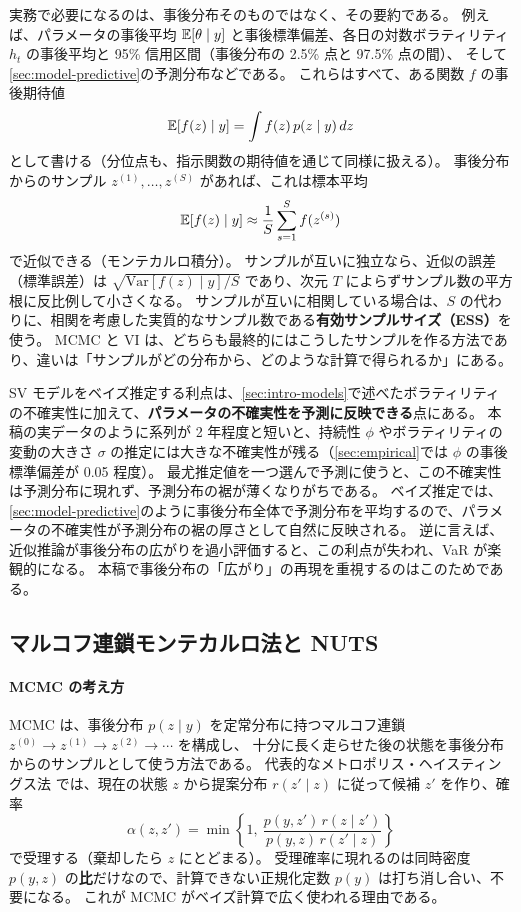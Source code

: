 実務で必要になるのは、事後分布そのものではなく、その要約である。
例えば、パラメータの事後平均 $\mathbb{E}[\theta \mid y]$ と事後標準偏差、各日の対数ボラティリティ $h_t$ の事後平均と 95\% 信用区間（事後分布の 2.5\% 点と 97.5\% 点の間）、
そして\cref{sec:model-predictive}の予測分布などである。
これらはすべて、ある関数 $f$ の事後期待値
\[
  \mathbb{E}[f(z) \mid y] = \int f(z)\, p(z \mid y)\, dz
\]
として書ける（分位点も、指示関数の期待値を通じて同様に扱える）。
事後分布からのサンプル $z^{(1)}, \dots, z^{(S)}$ があれば、これは標本平均
\[
  \mathbb{E}[f(z) \mid y] \approx \frac{1}{S} \sum_{s=1}^{S} f(z^{(s)})
\]
で近似できる（モンテカルロ積分）。
サンプルが互いに独立なら、近似の誤差（標準誤差）は $\sqrt{\mathrm{Var}[f(z) \mid y] / S}$ であり、次元 $T$ によらずサンプル数の平方根に反比例して小さくなる。
サンプルが互いに相関している場合は、$S$ の代わりに、相関を考慮した実質的なサンプル数である\textbf{有効サンプルサイズ（ESS）}を使う。
MCMC と VI は、どちらも最終的にはこうしたサンプルを作る方法であり、違いは「サンプルがどの分布から、どのような計算で得られるか」にある。

SV モデルをベイズ推定する利点は、\cref{sec:intro-models}で述べたボラティリティの不確実性に加えて、\textbf{パラメータの不確実性を予測に反映できる}点にある。
本稿の実データのように系列が 2 年程度と短いと、持続性 $\phi$ やボラティリティの変動の大きさ $\sigma$ の推定には大きな不確実性が残る（\cref{sec:empirical}では $\phi$ の事後標準偏差が 0.05 程度）。
最尤推定値を一つ選んで予測に使うと、この不確実性は予測分布に現れず、予測分布の裾が薄くなりがちである。
ベイズ推定では、\cref{sec:model-predictive}のように事後分布全体で予測分布を平均するので、パラメータの不確実性が予測分布の裾の厚さとして自然に反映される。
逆に言えば、近似推論が事後分布の広がりを過小評価すると、この利点が失われ、VaR が楽観的になる。
本稿で事後分布の「広がり」の再現を重視するのはこのためである。

\subsection{マルコフ連鎖モンテカルロ法と NUTS}\label{sec:inf-mcmc}

\paragraph{MCMC の考え方}
MCMC は、事後分布 $p(z \mid y)$ を定常分布に持つマルコフ連鎖 $z^{(0)} \to z^{(1)} \to z^{(2)} \to \cdots$ を構成し、
十分に長く走らせた後の状態を事後分布からのサンプルとして使う方法である。
代表的なメトロポリス・ヘイスティングス法 \parencite{metropolis1953,hastings1970} では、現在の状態 $z$ から提案分布 $r(z' \mid z)$ に従って候補 $z'$ を作り、確率
\[
  \alpha(z, z') = \min\left\{1,\ \frac{p(y, z')\, r(z \mid z')}{p(y, z)\, r(z' \mid z)}\right\}
\]
で受理する（棄却したら $z$ にとどまる）。
受理確率に現れるのは同時密度 $p(y, z)$ の\textbf{比}だけなので、計算できない正規化定数 $p(y)$ は打ち消し合い、不要になる。
これが MCMC がベイズ計算で広く使われる理由である。

